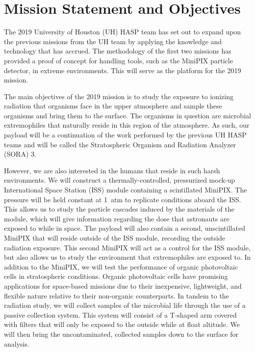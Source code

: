 \section{Mission Statement and Objectives}
\label{sec:Introduction}


The 2019 University of Houston (UH) HASP team has set out to expand upon the previous missions \cite{SORA1}\cite{SORA2} from the UH team by applying the knowledge and technology that has accrued.
The methodology of the first two missions has provided a proof of concept for handling tools, such as the MiniPIX particle detector, in extreme environments.
This will serve as the platform for the 2019 mission.

The main objectives of the 2019 mission is to study the exposure to ionizing radiation that organisms face in the upper atmosphere and sample these organisms and bring them to the surface.
The organisms in question are microbial extremophiles that naturally reside in this region of the atmosphere.
As such, our payload will be a continuation of the work performed by the previous UH HASP teams and will be called the Stratospheric Organism and Radiation Analyzer (SORA) 3.

However, we are also interested in the humans that reside in such harsh environments.
We will construct a thermally-controlled, pressurized mock-up International Space Station (ISS) module containing a scintillated MiniPIX.
The pressure will be held constant at \SI{1}{atm} to replicate conditions aboard the ISS.
This allows us to study the particle cascades induced by the materials of the module, which will give information regarding the dose that astronauts are exposed to while in space.
The payload will also contain a second, unscintillated MiniPIX that will reside outside of the ISS module, recording the outside radiation exposure.
This second MiniPIX will act as a control for the ISS module, but also allows us to study the environment that extremophiles are exposed to.
In addition to the MiniPIX, we will test the performance of organic photovoltaic cells in stratospheric conditions.
Organic photovoltaic cells have promising applications for space-based missions due to their inexpensive, lightweight, and flexible nature relative to their non-organic counterparts.
In tandem to the radiation study, we will collect samples of the microbial life through the use of a passive collection system.
This system will consist of a T-shaped arm covered with filters that will only be exposed to the outside while at float altitude.
We will then bring the uncontaminated, collected samples down to the surface for analysis.

